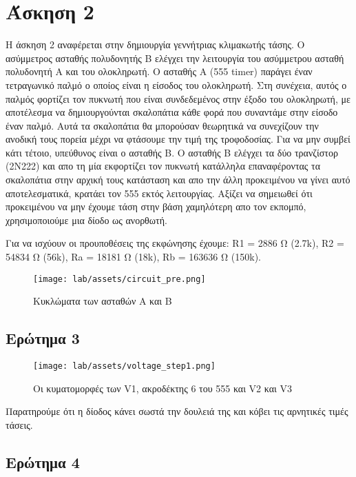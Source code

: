 \documentclass[12pt, a4paper]{article}
\begin{document}
\section{Άσκηση 2}

Η άσκηση 2 αναφέρεται στην δημιουργία γεννήτριας κλιμακωτής τάσης. Ο ασύμμετρος ασταθής πολυδονητής Β ελέγχει την λειτουργία του ασύμμετρου ασταθή πολυδονητή  Α και του ολοκληρωτή. Ο ασταθής Α (555 timer) παράγει έναν τετραγωνικό παλμό ο οποίος είναι η είσοδος του ολοκληρωτή. Στη συνέχεια, αυτός ο παλμός φορτίζει τον πυκνωτή που είναι συνδεδεμένος στην έξοδο του ολοκληρωτή, με αποτέλεσμα να δημιουργούνται σκαλοπάτια κάθε φορά που συναντάμε στην είσοδο έναν παλμό. Αυτά τα σκαλοπάτια θα μπορούσαν θεωρητικά να συνεχίζουν την ανοδική τους πορεία μέχρι να φτάσουμε την τιμή της τροφοδοσίας. Για να μην συμβεί κάτι τέτοιο, υπεύθυνος είναι ο ασταθής Β. Ο ασταθής Β ελέγχει τα δύο τρανζίστορ (2Ν222) και απο τη μία εκφορτίζει τον πυκνωτή κατάλληλα επαναφέροντας τα σκαλοπάτια στην αρχική τους κατάσταση και απο την άλλη προκειμένου να γίνει αυτό αποτελεσματικά, κρατάει τον 555 εκτός λειτουργίας. Αξίζει να σημειωθεί ότι προκειμένου να μην έχουμε τάση στην βάση χαμηλότερη απο τον εκπομπό, χρησιμοποιούμε μια δίοδο ως ανορθωτή.

Για να ισχύουν οι προυποθέσεις της εκφώνησης έχουμε: R1 = 2886 Ω (2.7k), R2 = 54834 Ω (56k), Ra = 18181 Ω (18k), Rb = 163636 Ω (150k).

\begin{figure}[h!]
    \centering
	\texttt{[image: lab/assets/circuit\_pre.png]}
	\caption{Κυκλώματα των ασταθών Α και Β}
\end{figure}

\subsection{Ερώτημα 3}
\begin{figure}[h!]
    \centering
	\texttt{[image: lab/assets/voltage\_step1.png]}
	\caption{Οι κυματομορφές των V1, ακροδέκτης 6 του 555 και V2 και V3}
\end{figure}

Παρατηρούμε ότι η δίοδος κάνει σωστά την δουλειά της και κόβει τις αρνητικές τιμές τάσεις.

\subsection{Ερώτημα 4}
\end{document}
